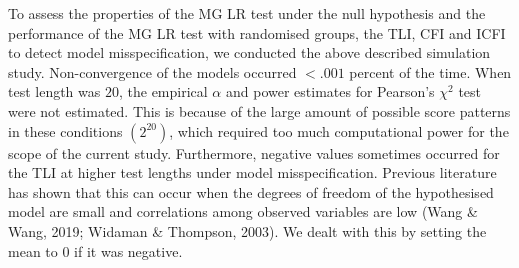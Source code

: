 \documentclass[Royal,sageapa,times,doublespace]{sagej}
\begin{document}
To assess the properties of the MG LR test under the null hypothesis and the performance of the MG LR test with randomised groups, the TLI, CFI and ICFI to detect model misspecification, we conducted the above described simulation study. Non-convergence of the models occurred $<.001$ percent of the time. When test length was $20$, the empirical $\alpha$ and power estimates for Pearson's $\chi^2$ test were not estimated. This is because of the large amount of possible score patterns in these conditions $(2^{20})$, which required too much computational power for the scope of the current study. Furthermore, negative values sometimes occurred for the TLI at higher test lengths under model misspecification. Previous literature has shown that this can occur when the degrees of freedom of the hypothesised model are small and correlations among observed variables are low (Wang \& Wang, 2019; Widaman \& Thompson, 2003). We dealt with this by setting the mean to $0$ if it was negative. \\
\end{document}
